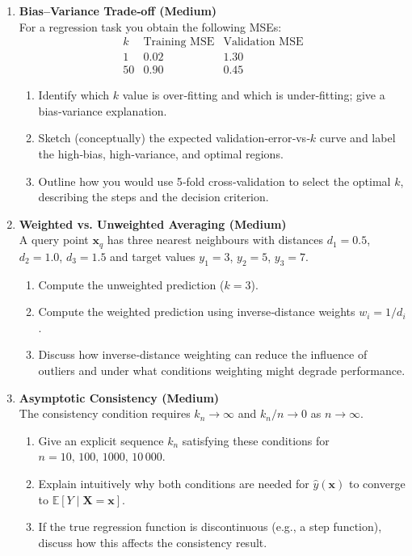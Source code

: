 \documentclass[12pt, a4paper]{article}
\begin{document}
\begin{enumerate}
  \item \textbf{Bias–Variance Trade‑off (Medium)}\\
    For a regression task you obtain the following MSEs:
    \[
    \begin{array}{c|c|c}
    k & \text{Training MSE} & \text{Validation MSE}\\\hline
    1 & 0.02 & 1.30\\
    50& 0.90 & 0.45
    \end{array}
    \]
    \begin{enumerate}[label=\alph)]
      \item Identify which \(k\) value is over‑fitting and which is under‑fitting; give a bias‑variance explanation.
      \item Sketch (conceptually) the expected validation‑error‑vs‑\(k\) curve and label the high‑bias, high‑variance, and optimal regions.
      \item Outline how you would use 5‑fold cross‑validation to select the optimal \(k\), describing the steps and the decision criterion.
    \end{enumerate}

  \item \textbf{Weighted vs. Unweighted Averaging (Medium)}\\
    A query point \(\mathbf{x}_q\) has three nearest neighbours with distances \(d_1=0.5\), \(d_2=1.0\), \(d_3=1.5\) and target values \(y_1=3\), \(y_2=5\), \(y_3=7\).
    \begin{enumerate}[label=\alph)]
      \item Compute the unweighted prediction (\(k=3\)).
      \item Compute the weighted prediction using inverse‑distance weights \(w_i=1/d_i\).
      \item Discuss how inverse‑distance weighting can reduce the influence of outliers and under what conditions weighting might degrade performance.
    \end{enumerate}

  \item \textbf{Asymptotic Consistency (Medium)}\\
    The consistency condition requires \(k_n\!\to\!\infty\) and \(k_n/n\!\to\!0\) as \(n\!\to\!\infty\).
    \begin{enumerate}[label=\alph)]
      \item Give an explicit sequence \(k_n\) satisfying these conditions for \(n=10,\,100,\,1000,\,10\,000\).
      \item Explain intuitively why both conditions are needed for \(\hat y(\mathbf{x})\) to converge to \(\mathbb{E}[Y\mid\mathbf{X}=\mathbf{x}]\).
      \item If the true regression function is discontinuous (e.g., a step function), discuss how this affects the consistency result.
    \end{enumerate}


\end{enumerate}
\end{document}
